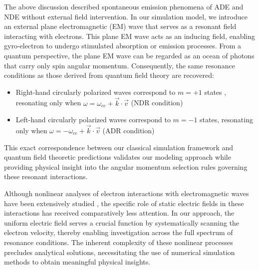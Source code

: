 \documentclass{cpbtex3}
\begin{document}
The above discussion described spontaneous emission phenomena of ADE and NDE without external field intervention. In our simulation model, we introduce an external plane electromagnetic (EM) wave that serves as a resonant field interacting with electrons. This plane EM wave acts as an inducing field, enabling gyro-electron to undergo stimulated absorption or emission processes. 
From a quantum perspective,  the plane EM wave can be regarded as an ocean of photons that carry only spin angular momentum. Consequently, the same resonance conditions as those derived from quantum field theory are recovered:

\begin{itemize}
    \item Right-hand circularly polarized  waves correspond to $m = +1$ states \cite{wei2024spin}, resonating only when $\omega = \omega_{ce} + \vec{k}\cdot\vec{v}$ (NDR condition)
    
    \item Left-hand circularly polarized  waves correspond to $m = -1$ states, resonating only when $\omega = -\omega_{ce} + \vec{k}\cdot\vec{v}$ (ADR condition)
\end{itemize}

This exact correspondence between our classical simulation framework and quantum field theoretic predictions validates our modeling approach while providing physical insight into the angular momentum selection rules governing these resonant interactions.


Although nonlinear analyses of electron interactions with electromagnetic waves have been extensively studied \cite{liu2004particle,qian1999exact,weyssow1990motion,gogoberidze2005origin,roberts1964motion,bourdier2000dynamics,nusinovich1999theory,nusinovich1995theory,qian2000relativistic}, the specific role of static electric fields in these interactions has received comparatively less attention. In our approach, the uniform electric field serves a crucial function by systematically scanning the electron velocity, thereby enabling investigation across the full spectrum of resonance conditions. The inherent complexity of these nonlinear processes precludes analytical solutions, necessitating the use of numerical simulation methods to obtain meaningful physical insights.
\end{document}
